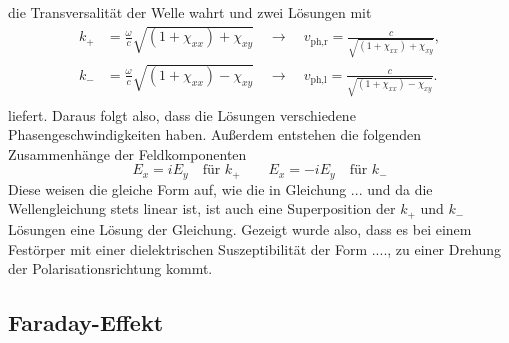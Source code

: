 die Transversalität der Welle wahrt und zwei Lösungen mit
\begin{align*}
    k_+ &= \frac{\omega}{c} \sqrt{(1+\chi_{xx})+ \chi_{xy}} \quad \to \quad v_{\text{ph,r}} = \frac{c}{\sqrt{(1+\chi_{xx})+ \chi_{xy}}}, \\
    k_- &= \frac{\omega}{c} \sqrt{(1+\chi_{xx})- \chi_{xy}} \quad \to \quad v_{\text{ph,l}} = \frac{c}{\sqrt{(1+\chi_{xx})- \chi_{xy}}}.\\
\end{align*}
liefert. Daraus folgt also, dass die Lösungen verschiedene Phasengeschwindigkeiten haben.
Außerdem entstehen die folgenden Zusammenhänge der Feldkomponenten
\begin{equation*}
    E_x = i E_y \quad \text{für } k_+ \quad \quad E_x = -i E_y \quad \text{für } k_-
\end{equation*}
Diese weisen die gleiche Form auf, wie die in Gleichung ... und da die Wellengleichung stets linear ist, ist auch eine Superposition der $k_+$ und $k_-$ Lösungen 
eine Lösung der Gleichung. Gezeigt wurde also, dass es bei einem Festörper mit einer dielektrischen Suszeptibilität der Form ...., zu einer Drehung der Polarisationsrichtung
kommt.

\subsection{Faraday-Effekt}
